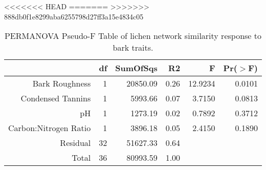 <<<<<<< HEAD
=======
>>>>>>> 888db0f1e8299aba6255798d27ff3a15e4834c05
\begin{table}[ht]
\centering
\begin{tabular}{rrrrrr}
  \hline
 & df & SumOfSqs & R2 & F & Pr($>$F) \\ 
  \hline
Bark Roughness & 1 & 20850.09 & 0.26 & 12.9234 & 0.0101 \\ 
  Condensed Tannins & 1 & 5993.66 & 0.07 & 3.7150 & 0.0813 \\ 
  pH & 1 & 1273.19 & 0.02 & 0.7892 & 0.3712 \\ 
  Carbon:Nitrogen Ratio & 1 & 3896.18 & 0.05 & 2.4150 & 0.1890 \\ 
  Residual & 32 & 51627.33 & 0.64 &  &  \\ 
  Total & 36 & 80993.59 & 1.00 &  &  \\ 
   \hline
\end{tabular}
\caption{PERMANOVA Pseudo-F Table of lichen network similarity response to bark traits.} 
\label{tab:cn_trait_perm}
\end{table}
